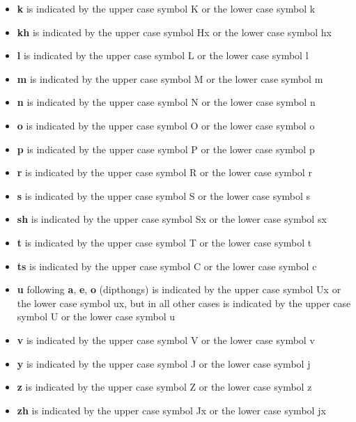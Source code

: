 \begin{itemize}
\item \textbf{k}  is indicated by the upper case symbol {\confont K}  or the lower case symbol {\confont k}
\item \textbf{kh} is indicated by the upper case symbol {\confont Hx} or the lower case symbol {\confont hx}
\item \textbf{l}  is indicated by the upper case symbol {\confont L}  or the lower case symbol {\confont l}
\item \textbf{m}  is indicated by the upper case symbol {\confont M}  or the lower case symbol {\confont m}
\item \textbf{n}  is indicated by the upper case symbol {\confont N}  or the lower case symbol {\confont n}
\item \textbf{o}  is indicated by the upper case symbol {\confont O}  or the lower case symbol {\confont o}
\item \textbf{p}  is indicated by the upper case symbol {\confont P}  or the lower case symbol {\confont p}
\item \textbf{r}  is indicated by the upper case symbol {\confont R}  or the lower case symbol {\confont r}
\item \textbf{s}  is indicated by the upper case symbol {\confont S}  or the lower case symbol {\confont s}
\item \textbf{sh} is indicated by the upper case symbol {\confont Sx} or the lower case symbol {\confont sx}
\item \textbf{t}  is indicated by the upper case symbol {\confont T}  or the lower case symbol {\confont t}
\item \textbf{ts} is indicated by the upper case symbol {\confont C}  or the lower case symbol {\confont c}
\item \textbf{u} following \textbf{a}, \textbf{e}, \textbf{o} (dipthongs) is indicated by the upper case symbol {\confont Ux} or the lower case symbol {\confont ux}, but in all other cases is indicated by the upper case symbol {\confont U} or the lower case symbol {\confont u}
\item \textbf{v}  is indicated by the upper case symbol {\confont V}  or the lower case symbol {\confont v}
\item \textbf{y}  is indicated by the upper case symbol {\confont J}  or the lower case symbol {\confont j}
\item \textbf{z}  is indicated by the upper case symbol {\confont Z}  or the lower case symbol {\confont z}
\item \textbf{zh} is indicated by the upper case symbol {\confont Jx} or the lower case symbol {\confont jx}
\end{itemize}

